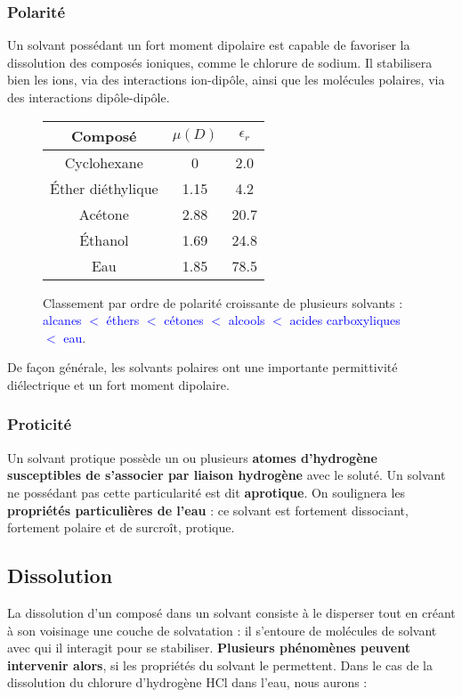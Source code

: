 \documentclass[11pt,a4paper]{report}
\begin{document}
\subsubsection{Polarité}

Un solvant possédant un fort moment dipolaire est capable de favoriser la dissolution des composés ioniques, comme le chlorure de sodium. Il stabilisera bien les ions, via des interactions ion-dipôle, ainsi que les molécules polaires, via des interactions dipôle-dipôle.

\begin{figure}[h!]
	\begin{center}
	\begin{tabular}{|c|c|c|}
		\hline
		Composé & $\mu (D)$ & $\epsilon_r$ \\
		\hline
		Cyclohexane & 0 & 2.0\\
		\hline
		Éther diéthylique & 1.15 & 4.2\\
		\hline
		Acétone & 2.88 & 20.7\\
		\hline
		Éthanol & 1.69 & 24.8\\
		\hline 
		Eau & 1.85 & 78.5\\
		\hline
	\end{tabular}	
	\end{center}
	\caption{Classement par ordre de polarité croissante de plusieurs solvants : 
	\textcolor{blue}{alcanes $<$ éthers $<$ cétones $<$ alcools $<$ acides carboxyliques $<$ eau}.}
\end{figure}	

De façon générale, les solvants polaires ont une importante permittivité diélectrique et un fort moment dipolaire.

\subsubsection{Proticité}

Un solvant protique possède un ou plusieurs \textbf{atomes d'hydrogène susceptibles de s'associer par liaison hydrogène} avec le soluté. Un solvant ne possédant pas cette particularité est dit \textbf{aprotique}. On soulignera les \textbf{propriétés particulières de l'eau} : ce solvant est fortement dissociant, fortement polaire et de surcroît, protique.

\newpage
\subsection{Dissolution}

La dissolution d'un composé dans un solvant consiste à le disperser tout en créant à son voisinage une couche de solvatation : il s'entoure de molécules de solvant avec qui il interagit pour se stabiliser. \textbf{Plusieurs phénomènes peuvent intervenir alors}, si les propriétés du solvant le permettent. Dans le cas de la dissolution du chlorure d'hydrogène HCl dans l'eau, nous aurons :
\end{document}
